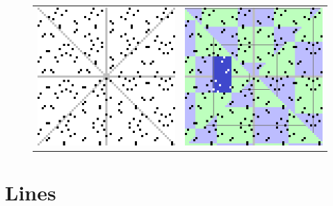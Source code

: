 \documentclass{article}
\begin{document}
\begin{figure}[h!]
\begin{tabular}{cc}
	\includegraphics[scale=0.7]{m2_n3_p17_d} & \includegraphics[scale=0.7]{m2_n3_p17_s}
	\end{tabular}
	\label{symmetryplots}
\end{figure}



\section{Lines}
\end{document}
